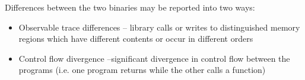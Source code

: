 Differences between the two binaries may be reported into two ways:
\begin{itemize}
\item Observable trace differences -- library calls or writes to
  distinguished memory regions which have different contents or occur in
  different orders
\item Control flow divergence --significant divergence in control flow
  between the programs (i.e. one program returns while the other calls a
  function)
\end{itemize}
      


